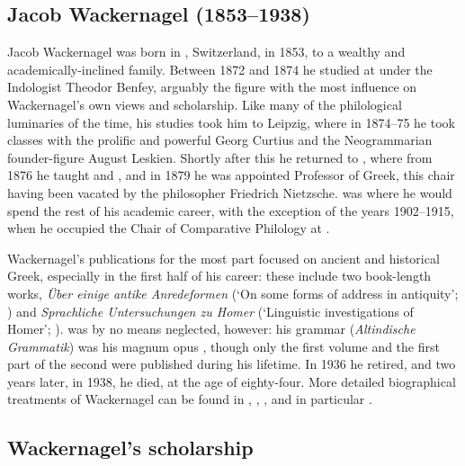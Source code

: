 \subsection{Jacob Wackernagel (1853--1938)}
Jacob Wackernagel was born in , Switzerland, in 1853, to a wealthy and academically-inclined family. Between 1872 and 1874 he studied at  under the Indologist Theodor Benfey, arguably the figure with the most influence on Wackernagel's own views and scholarship. Like many of the philological luminaries of the time, his studies took him to Leipzig, where in 1874--75 he took classes with the prolific and powerful Georg Curtius and the Neogrammarian founder-figure August Leskien. Shortly after this he returned to , where from 1876 he taught  and , and in 1879 he was appointed Professor of Greek, this chair having been vacated by the philosopher Friedrich Nietzsche.  was where he would spend the rest of his academic career, with the exception of the years 1902--1915, when he occupied the Chair of Comparative Philology at .

Wackernagel's publications for the most part focused on ancient and historical Greek, especially in the first half of his career: these include two book-length works, \emph{Über einige antike Anredeformen} (`On some forms of address in antiquity'; \citeyear{Wackernagel1912}) and \emph{Sprachliche Untersuchungen zu Homer} (`Linguistic investigations of Homer'; \citeyear{Wackernagel1916}).  was by no means neglected, however: his  grammar (\emph{Altindische Grammatik}) was his magnum opus \citep[x]{Langslow2009}, though only the first volume \citeyearpar{Wackernagel1896} and the first part of the second \citeyearpar{Wackernagel1905} were published during his lifetime. In 1936 he retired, and two years later, in 1938, he died, at the age of eighty-four. More detailed biographical treatments of Wackernagel can be found in \citet{Schwyzer1938}, \citet{Schlerath1990}, \citet[viii--xviii]{Langslow2009}, and in particular \citet{Schmitt1990}.

\subsection{Wackernagel's scholarship}

